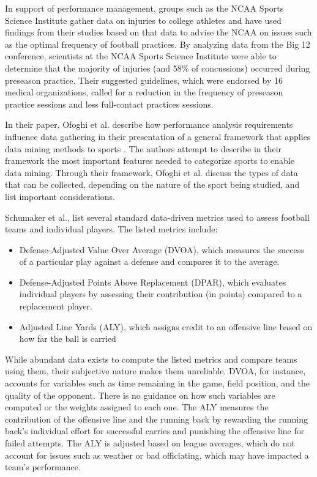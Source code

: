 \documentclass[sigconf]{acmart}
\begin{document}
In support of performance management, groups such as the NCAA Sports Science Institute gather data on injuries to college athletes and have used findings from their studies based on that data to advise the NCAA on issues such as the optimal frequency of football practices\cite{Solomon2017}. By analyzing data from the Big 12 conference, scientists at the NCAA Sports Science Institute were able to determine that the majority of injuries (and 58\% of concussions) occurred during preseason practice. Their suggested guidelines, which were endorsed by 16 medical organizations, called for a reduction in the frequency of preseason practice sessions and less full-contact practices sessions.

In their paper, Ofoghi et al. describe how performance analysis requirements influence data gathering in their presentation of a general framework that applies data mining methods to sports \cite{Ofoghi2013}. The authors attempt to describe in their framework the most important features needed to categorize sports to enable data mining. Through their framework, Ofoghi et al. discuss the types of data that can be collected, depending on the nature of the sport being studied, and list important considerations. 

Schumaker et al., list several standard data-driven metrics used to assess football teams and individual players\cite{Shumaker2010}. The listed metrics include:
\begin{itemize}
  \item Defense-Adjusted Value Over Average (DVOA), which measures the success of a particular play against a defense and compares it to the average. 
  \item Defense-Adjusted Points Above Replacement (DPAR), which evaluates individual players by assessing their contribution (in points) compared to a replacement player. 
  \item Adjusted Line Yards (ALY), which assigns credit to an offensive line based on how far the ball is carried
\end{itemize}

While abundant data exists to compute the listed metrics and compare teams using them, their subjective nature makes them unreliable. DVOA, for instance, accounts for variables such as time remaining in the game, field position, and the quality of the opponent. There is no guidance on how such variables are computed or the weights assigned to each one. The ALY measures the contribution of the offensive line and the running back by rewarding the running back's individual effort for successful carries and punishing the offensive line for failed attempts. The ALY is adjusted based on league averages, which do not account for issues such as weather or bad officiating, which may have impacted a team's performance.
\end{document}
